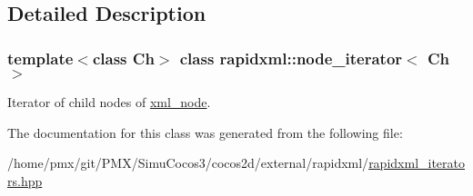 \subsection{Detailed Description}
\subsubsection*{template$<$class Ch$>$\newline
class rapidxml\+::node\+\_\+iterator$<$ Ch $>$}

Iterator of child nodes of \hyperlink{classrapidxml_1_1xml__node}{xml\+\_\+node}. 

The documentation for this class was generated from the following file\+:\begin{DoxyCompactItemize}
\item 
/home/pmx/git/\+P\+M\+X/\+Simu\+Cocos3/cocos2d/external/rapidxml/\hyperlink{rapidxml__iterators_8hpp}{rapidxml\+\_\+iterators.\+hpp}\end{DoxyCompactItemize}
